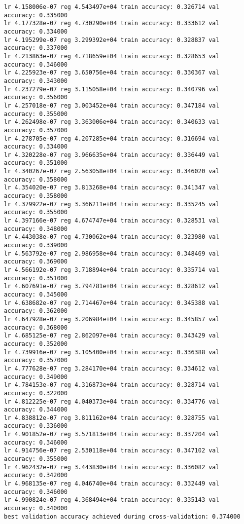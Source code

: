 \documentclass[11pt]{article}
\begin{document}
\begin{Verbatim}[commandchars=\\\{\}]
lr 4.158006e-07 reg 4.543497e+04 train accuracy: 0.326714 val accuracy: 0.335000
lr 4.177328e-07 reg 4.730290e+04 train accuracy: 0.333612 val accuracy: 0.334000
lr 4.195299e-07 reg 3.299392e+04 train accuracy: 0.328837 val accuracy: 0.337000
lr 4.213863e-07 reg 4.718659e+04 train accuracy: 0.328653 val accuracy: 0.346000
lr 4.225923e-07 reg 3.650756e+04 train accuracy: 0.330367 val accuracy: 0.343000
lr 4.237279e-07 reg 3.115058e+04 train accuracy: 0.340796 val accuracy: 0.356000
lr 4.257018e-07 reg 3.003452e+04 train accuracy: 0.347184 val accuracy: 0.355000
lr 4.262498e-07 reg 3.363006e+04 train accuracy: 0.340633 val accuracy: 0.357000
lr 4.278705e-07 reg 4.207285e+04 train accuracy: 0.316694 val accuracy: 0.334000
lr 4.320228e-07 reg 3.966635e+04 train accuracy: 0.336449 val accuracy: 0.351000
lr 4.340267e-07 reg 2.563058e+04 train accuracy: 0.346020 val accuracy: 0.358000
lr 4.354020e-07 reg 3.813268e+04 train accuracy: 0.341347 val accuracy: 0.358000
lr 4.379922e-07 reg 3.366211e+04 train accuracy: 0.335245 val accuracy: 0.355000
lr 4.397166e-07 reg 4.674747e+04 train accuracy: 0.328531 val accuracy: 0.348000
lr 4.443038e-07 reg 4.730062e+04 train accuracy: 0.323980 val accuracy: 0.339000
lr 4.563792e-07 reg 2.986958e+04 train accuracy: 0.348469 val accuracy: 0.369000
lr 4.566192e-07 reg 3.718894e+04 train accuracy: 0.335714 val accuracy: 0.351000
lr 4.607691e-07 reg 3.794781e+04 train accuracy: 0.328612 val accuracy: 0.345000
lr 4.638682e-07 reg 2.714467e+04 train accuracy: 0.345388 val accuracy: 0.362000
lr 4.647928e-07 reg 3.206984e+04 train accuracy: 0.345857 val accuracy: 0.368000
lr 4.685125e-07 reg 2.862097e+04 train accuracy: 0.343429 val accuracy: 0.352000
lr 4.739916e-07 reg 3.105400e+04 train accuracy: 0.336388 val accuracy: 0.357000
lr 4.777628e-07 reg 3.284170e+04 train accuracy: 0.334612 val accuracy: 0.349000
lr 4.784153e-07 reg 4.316873e+04 train accuracy: 0.328714 val accuracy: 0.322000
lr 4.812225e-07 reg 4.040373e+04 train accuracy: 0.334776 val accuracy: 0.344000
lr 4.838812e-07 reg 3.811162e+04 train accuracy: 0.328755 val accuracy: 0.336000
lr 4.901852e-07 reg 3.571813e+04 train accuracy: 0.337204 val accuracy: 0.346000
lr 4.914756e-07 reg 2.530118e+04 train accuracy: 0.347102 val accuracy: 0.355000
lr 4.962432e-07 reg 3.443830e+04 train accuracy: 0.336082 val accuracy: 0.342000
lr 4.968135e-07 reg 4.046740e+04 train accuracy: 0.332449 val accuracy: 0.346000
lr 4.990824e-07 reg 4.368494e+04 train accuracy: 0.335143 val accuracy: 0.340000
best validation accuracy achieved during cross-validation: 0.374000

    \end{Verbatim}
\end{document}
